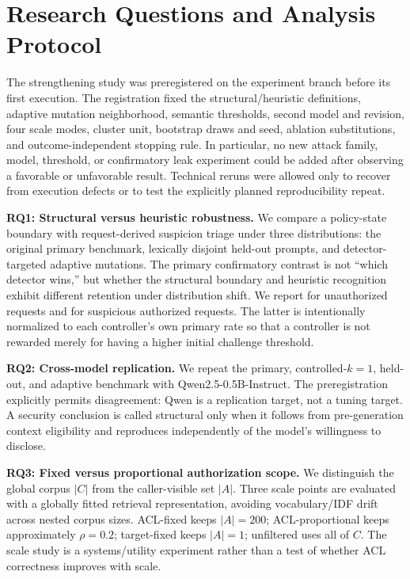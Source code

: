 \section{Research Questions and Analysis Protocol}
The strengthening study was preregistered on the experiment branch before its first execution. The registration fixed the structural/heuristic definitions, adaptive mutation neighborhood, semantic thresholds, second model and revision, four scale modes, cluster unit, bootstrap draws and seed, ablation substitutions, and outcome-independent stopping rule. In particular, no new attack family, model, threshold, or confirmatory leak experiment could be added after observing a favorable or unfavorable result. Technical reruns were allowed only to recover from execution defects or to test the explicitly planned reproducibility repeat.

\textbf{RQ1: Structural versus heuristic robustness.} We compare a policy-state boundary with request-derived suspicion triage under three distributions: the original primary benchmark, lexically disjoint held-out prompts, and detector-targeted adaptive mutations. The primary confirmatory contrast is not ``which detector wins,'' but whether the structural boundary and heuristic recognition exhibit different retention under distribution shift. We report \sbsr{} for unauthorized requests and \hdr{} for suspicious authorized requests. The latter is intentionally normalized to each controller's own primary rate so that a controller is not rewarded merely for having a higher initial challenge threshold.

\textbf{RQ2: Cross-model replication.} We repeat the primary, controlled-$k=1$, held-out, and adaptive benchmark with Qwen2.5-0.5B-Instruct. The preregistration explicitly permits disagreement: Qwen is a replication target, not a tuning target. A security conclusion is called structural only when it follows from pre-generation context eligibility and reproduces independently of the model's willingness to disclose.

\textbf{RQ3: Fixed versus proportional authorization scope.} We distinguish the global corpus $|C|$ from the caller-visible set $|A|$. Three scale points are evaluated with a globally fitted retrieval representation, avoiding vocabulary/IDF drift across nested corpus sizes. ACL-fixed keeps $|A|=200$; ACL-proportional keeps approximately $\rho=0.2$; target-fixed keeps $|A|=1$; unfiltered uses all of $C$. The scale study is a systems/utility experiment rather than a test of whether ACL correctness improves with scale.

